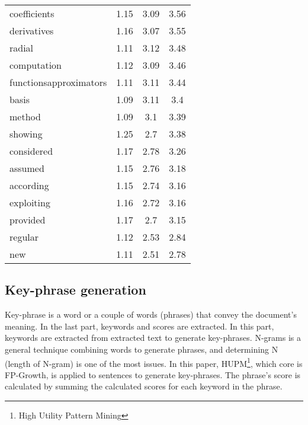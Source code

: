 \documentclass[3p]{elsarticle}
\begin{document}
\begin{table}[]
\begin{center}
\begin{tabular}{lccc}
            coefficients           & 1.15   & 3.09    & 3.56  \\
            derivatives            & 1.16   & 3.07    & 3.55  \\
            radial                 & 1.11   & 3.12    & 3.48  \\
            computation            & 1.12   & 3.09    & 3.46  \\
            functionsapproximators & 1.11   & 3.11    & 3.44  \\
            basis                  & 1.09   & 3.11    & 3.4   \\
            method                 & 1.09   & 3.1     & 3.39  \\
            showing                & 1.25   & 2.7     & 3.38  \\
            considered             & 1.17   & 2.78    & 3.26  \\
            assumed                & 1.15   & 2.76    & 3.18  \\
            according              & 1.15   & 2.74    & 3.16  \\
            exploiting             & 1.16   & 2.72    & 3.16  \\
            provided               & 1.17   & 2.7     & 3.15  \\
            regular                & 1.12   & 2.53    & 2.84  \\
            new                    & 1.11   & 2.51    & 2.78 \\
            \hline
        \end{tabular}
     \end{center}
     \end{table}
\subsection{Key-phrase generation}
Key-phrase is a word or a couple of words (phrases) that convey the document's meaning. In the last part, keywords and scores are extracted. In this part, keywords are extracted from extracted text to generate key-phrases. N-grams is a general technique combining words to generate phrases, and determining N (length of N-gram) is one of the most issues. In this paper, HUPM\footnote{High Utility Pattern Mining}\cite{huang2015topic}, which core is FP-Growth, is applied to sentences to generate key-phrases. The phrase's score is calculated by summing the calculated scores for each keyword in the phrase.
\end{document}
